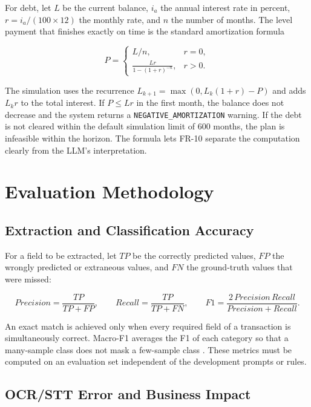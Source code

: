 For debt, let $L$ be the current balance, $i_a$ the annual interest rate
in percent, $r=i_a/(100\times12)$ the monthly rate, and $n$ the number
of months. The level payment that finishes exactly on time is the
standard amortization formula \cite{brealey2020}

\begin{equation}
  P=
  \left\{
  \begin{array}{ll}
    L/n, & r=0,\\[2mm]
    \displaystyle\frac{Lr}{1-(1+r)^{-n}}, & r>0.
  \end{array}
  \right.
\end{equation}

The simulation uses the recurrence
$L_{k+1}=\max(0,L_k(1+r)-P)$ and adds $L_kr$ to the total interest. If
$P\leq Lr$ in the first month, the balance does not decrease and the
system returns a \texttt{NEGATIVE\_AMORTIZATION} warning. If the debt is
not cleared within the default simulation limit of 600 months, the plan
is infeasible within the horizon. The formula lets FR-10 separate the
computation clearly from the LLM's interpretation.

\section{Evaluation Methodology}

\subsection{Extraction and Classification Accuracy}

For a field to be extracted, let $TP$ be the correctly predicted values,
$FP$ the wrongly predicted or extraneous values, and $FN$ the
ground-truth values that were missed:

\begin{equation}
  Precision=\frac{TP}{TP+FP},\qquad
  Recall=\frac{TP}{TP+FN},\qquad
  F1=\frac{2\,Precision\,Recall}{Precision+Recall}.
\end{equation}

An exact match is achieved only when every required field of a
transaction is simultaneously correct. Macro-F1 averages the F1 of each
category so that a many-sample class does not mask a few-sample class
\cite{sokolova2009}. These metrics must be computed on an evaluation set
independent of the development prompts or rules.

\subsection{OCR/STT Error and Business Impact}

